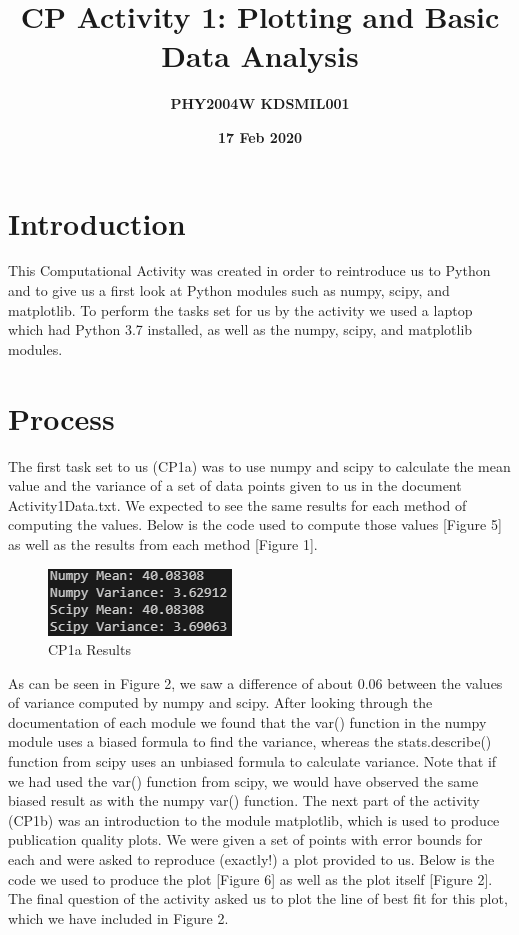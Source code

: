 \documentclass[12pt]{article}
\title{CP Activity 1: Plotting and Basic Data Analysis}
\author{\textbf{PHY2004W \hspace{8cm} KDSMIL001}}
\date{\textbf{17 Feb 2020}}
\begin{document}
    \begin{titlepage}
        \maketitle
        \tableofcontents
    \end{titlepage}

    \section{Introduction}
    This Computational Activity was created in order to reintroduce us to Python and to 
    give us a first look at Python modules such as numpy, scipy, and matplotlib. To perform 
    the tasks set for us by the activity we used a laptop which had Python 3.7 installed, 
    as well as the numpy, scipy, and matplotlib modules. 

    \section{Process}
    The first task set to us (CP1a) was to use numpy and scipy to calculate the mean value 
    and the variance of a set of data points given to us in the document Activity1Data.txt. 
    We expected to see the same results for each method of computing the values.
    Below is the code used to compute those values [Figure 5] as well as the results from 
    each method [Figure 1]. 

    \begin{figure}[H]
        \begin{center}
           \includegraphics[scale=1]{CP1a results.png}
           \caption{CP1a Results}
           \label{Figure 1}
        \end{center}
    \end{figure}
    
    \noindent
    As can be seen in Figure 2, we saw a difference of about 0.06 between the values of 
    variance computed by numpy and scipy. After looking through the documentation of each 
    module we found that the var() function in the numpy module uses a biased formula to 
    find the variance, whereas the stats.describe() function from scipy uses an unbiased 
    formula to calculate variance. Note that if we had used the var() function from scipy, 
    we would have observed the same biased result as with the numpy var() function.
    \newline
    \newline
    The next part of the activity (CP1b) was an introduction to the module matplotlib, which 
    is used to produce publication quality plots. We were given a set of points with error 
    bounds for each and were asked to reproduce (exactly!) a plot provided to us. Below 
    is the code we used to produce the plot [Figure 6] as well as the plot itself [Figure 2]. 
    The final question of the activity asked us to plot the line of best fit for this plot, 
    which we have included in Figure 2.
\end{document}
